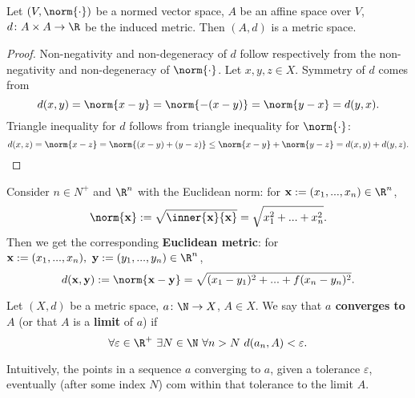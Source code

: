 \begin{proposition}
  Let
    $(V, \norm{\cdot})$ be a normed vector space,
    $A$ be an affine space over $V$,
    $d \colon A \times A \to \R$ be the induced metric.
  Then $(A, d)$ is a metric space.
\end{proposition}
\begin{proof}
  Non-negativity and non-degeneracy of $d$ follow respectively from
  the non-negativity and non-degeneracy of $\norm{\cdot}$.
  Let $x, y, z \in X$.
  Symmetry of $d$ comes from
  \begin{equation}
    d(x, y) = \norm{x - y} = \norm{- (x - y)} = \norm{y - x} = d(y, x).
  \end{equation}
  Triangle inequality for $d$ follows from triangle inequality for
  $\norm{\cdot}$:
  \begin{equation}
    d(x, z)
    = \norm{x - z}
    = \norm{(x - y) + (y - z)}
    \leq \norm{x - y} + \norm{y - z}
    = d(x, y) + d(y, z).
  \end{equation}
\end{proof}
\begin{example}
  Consider $n \in N^+$ and $\R^n$ with the Euclidean norm:
  for ${\bf x} := (x_1, ..., x_n) \in \R^n$,
  \begin{equation}
    \norm{\bf x}
    := \sqrt{\inner{\bf x}{\bf x}}
    = \sqrt{x_1^2 + ... + x_n^2}.
  \end{equation}
  Then we get the corresponding \textbf{Euclidean metric}:
  for ${\bf x} := (x_1, ..., x_n),\ {\bf y} := (y_1, ..., y_n) \in \R^n$,
  \begin{equation}
    d({\bf x}, {\bf y})
    := \norm{{\bf x} - {\bf y}}
    = \sqrt{(x_1 - y_1)^2 + ... +f (x_n - y_n)^2}.
  \end{equation}
\end{example}
\begin{definition}
  Let
    $(X, d)$ be a metric space,
    $a \colon \N \to X$,
    $A \in X$.
  We say that \textbf{$a$ converges to $A$}
  (or that $A$ is a \textbf{limit} of $a$) if
  \begin{equation}
    \forall \varepsilon \in \R^+\
      \exists N \in \N\
        \forall n > N\
          d(a_n, A) < \varepsilon.
  \end{equation}
\end{definition}
\begin{remark}
  Intuitively, the points in a sequence $a$ converging to $a$, given a tolerance
  $\varepsilon$, eventually (after some index $N$) com within that tolerance 
  to the limit $A$.
\end{remark}
